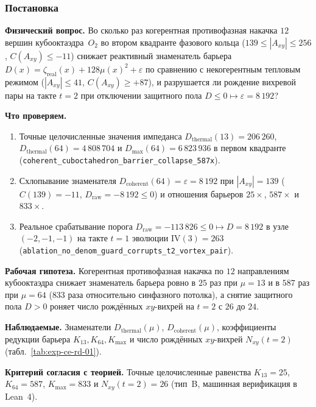 \label{exp:cerd01}

\subsubsection*{Постановка}
\textbf{Физический вопрос.}
Во сколько раз когерентная противофазная накачка $12$ вершин кубооктаэдра~$O_2$ во втором квадранте фазового кольца ($139 \le |A_{xy}| \le 256$, $C(A_{xy}) \le -11$) снижает реактивный знаменатель барьера $D(x) = \zeta_{\mathrm{real}}(x) + 128\mu(x)^2 + \varepsilon$ по сравнению с некогерентным тепловым режимом ($|A_{xy}| \le 41$, $C(A_{xy}) \ge +87$), и разрушается ли рождение вихревой пары на такте $t=2$ при отключении защитного пола $D \le 0 \mapsto \varepsilon = 8\,192$?

\textbf{Что проверяем.}
\begin{enumerate}[label=\textbf{(\alph*)},leftmargin=*,itemsep=0.25em]
\item Точные целочисленные значения импеданса $D_{\mathrm{thermal}}(13) = 206\,260$, $D_{\mathrm{thermal}}(64) = 4\,808\,704$ и $D_{\max}(64) = 6\,823\,936$ в первом квадранте (\texttt{coherent\_\allowbreak cuboctahedron\_\allowbreak barrier\_\allowbreak collapse\_\allowbreak 587x}).
\item Схлопывание знаменателя $D_{\mathrm{coherent}}(64) = \varepsilon = 8\,192$ при $|A_{xy}| = 139$ ($C(139) = -11$, $D_{\mathrm{raw}} = -8\,192 \le 0$) и отношения барьеров $25\times$, $587\times$ и $833\times$.
\item Реальное срабатывание порога $D_{\mathrm{raw}} = -113\,826 \le 0 \mapsto D = 8\,192$ в узле $(-2,-1,-1)$ на такте $t=1$ эволюции $\mathrm{IV}(3)=263$ (\texttt{ablation\_\allowbreak no\_\allowbreak denom\_\allowbreak guard\_\allowbreak corrupts\_\allowbreak t2\_\allowbreak vortex\_\allowbreak pair}).
\end{enumerate}

\textbf{Рабочая гипотеза.}
Когерентная противофазная накачка по $12$ направлениям кубооктаэдра снижает знаменатель барьера ровно в $25$ раз при $\mu=13$ и в $587$ раз при $\mu=64$ ($833$ раза относительно синфазного потолка), а снятие защитного пола $D>0$ роняет число рождённых $xy$-вихрей на $t=2$ с $26$ до $24$.

\textbf{Наблюдаемые.}
Знаменатели $D_{\mathrm{thermal}}(\mu)$, $D_{\mathrm{coherent}}(\mu)$, коэффициенты редукции барьера $K_{13}, K_{64}, K_{\max}$ и число рождённых $xy$-вихрей $N_{xy}(t=2)$ (табл.~\ref{tab:exp-ce-rd-01}).

\textbf{Критерий согласия с теорией.}
Точные целочисленные равенства $K_{13} = 25$, $K_{64} = 587$, $K_{\max} = 833$ и $N_{xy}(t=2) = 26$ (тип~B, машинная верификация в Lean~4).

